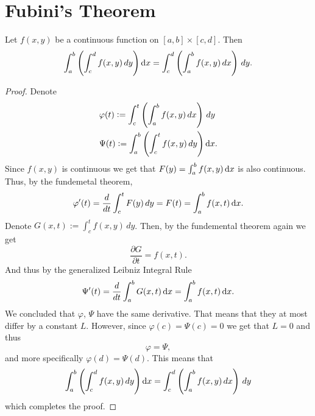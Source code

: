 \documentclass[11pt,a4paper]{article}
\begin{document}
  \newpage

  \section{Fubini's Theorem}
  \begin{theorem}
    Let $f(x,y)$ be a continuous function on $[a,b] \times [c,d]$.
    Then
    \[
      \int_a^b\left(\int_c^d{f(x,y)\, dy}\right)\dx
    = \int_c^d\left(\int_a^b{f(x,y)\, dx}\right)\,dy.
    \]
  \end{theorem}
  \begin{proof}
    Denote
    \begin{align*}
      &\varphi(t) := \int_c^t\left(\int_a^b{f(x,y)\, dx}\right)\,dy \\
      &\Psi(t) := \int_a^b\left(\int_c^t{f(x,y)\, dy}\right)\dx.
    \end{align*}
    Since $f(x,y)$ is continuous we get that $F(y) = \int_a^b{f(x,y)\dx}$ is 
    also continuous. Thus, by the fundemetal theorem,
    \[
      \varphi'(t) = \frac{d}{dt} \int_{c}^{t} F(y)\,dy =
      F(t) = \int_{a}^{b} f(x,t)\dx.
    \]
    Denote $G(x,t) := \int_c^t{f(x,y)\,dy}$.
    Then, by the fundemental theorem again we get
    \[
      \frac{\partial G}{\partial t} = f(x,t).
    \]
    And thus by the generalized Leibniz Integral Rule
    \[
      \Psi'(t) = \frac{d}{dt}\int_a^b{G(x,t)\dx} = \int_a^b{f(x,t)\dx}.
    \]
    We concluded that $\varphi$, $\Psi$ have the same derivative.
    That means that they at most differ by a constant $L$.
    However, since $\varphi(c) = \Psi(c) = 0$ we get that $L = 0$ and thus
    \[
      \varphi = \Psi,
    \]
    and more specifically $\varphi(d) = \Psi(d)$.
    This means that
    \[
      \int_a^b\left(\int_c^d{f(x,y)\, dy}\right)\dx
    = \int_c^d\left(\int_a^b{f(x,y)\, dx}\right)\,dy
    \]
    which completes the proof.
  \end{proof}

  \newpage
  
\end{document}
